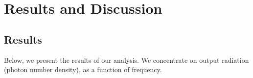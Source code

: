 \chapter{Results and Discussion}\label{ch:results}

\section{Results}\label{sec:results}

Below, we present the results of our analysis. We concentrate on output radiation (photon number density), as a function of frequency.

